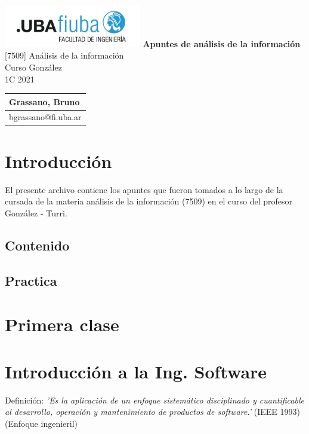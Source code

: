 \documentclass[titlepage,a4paper]{article}
\begin{document}
\begin{titlepage} %
	\hfill\includegraphics[width=6cm]{logofiuba.jpg}
    \centering
    \vfill
    \Huge \textbf{Apuntes de análisis de la información}
    \vskip2cm
    \Large [7509] Análisis de la información\\
    Curso González \\
    1C 2021 
    \vfill
    \begin{tabular}{ | l | }
      \hline
      Grassano, Bruno \\ \hline
      bgrassano@fi.uba.ar \\ \hline
  	\end{tabular}
    \vfill
    \vfill
\end{titlepage}

\tableofcontents %

\newpage

\section{Introducción}\label{sec:intro}
El presente archivo contiene los apuntes que fueron tomados a lo largo de la cursada de la materia análisis de la información (7509) en el curso del profesor González - Turri.

\subsection*{Contenido}

\subsection*{Practica}


\newpage

\section*{Primera clase}
\section{Introducción a la Ing. Software}
Definición: \textit{'Es la aplicación de un enfoque sistemático disciplinado y cuantificable al desarrollo, operación y mantenimiento de productos de software.'} (IEEE 1993) (Enfoque ingenieril)
\end{document}
